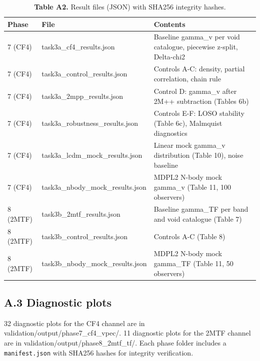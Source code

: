 \documentclass[11pt,a4paper]{article}
\begin{document}
\begin{table}[H]
\centering
\footnotesize
\caption{\textbf{Table A2.} Result files (JSON) with SHA256 integrity hashes.}
\begin{tabularx}{\linewidth}{l>{\RaggedRight\arraybackslash}X>{\RaggedRight\arraybackslash}X}
\toprule
\textbf{Phase} & \textbf{File} & \textbf{Contents} \tabularnewline
\midrule
7 (CF4) & task3a\_\allowbreak{}cf4\_\allowbreak{}results.json & Baseline gamma\_\allowbreak{}v per void catalogue, piecewise z-split, Delta-chi2 \tabularnewline
7 (CF4) & task3a\_\allowbreak{}control\_\allowbreak{}results.json & Controls A-C: density, partial correlation, chain rule \tabularnewline
7 (CF4) & task3a\_\allowbreak{}2mpp\_\allowbreak{}results.json & Control D: gamma\_\allowbreak{}v after 2M++ subtraction (Tables 6b) \tabularnewline
7 (CF4) & task3a\_\allowbreak{}robustness\_\allowbreak{}results.json & Controls E-F: LOSO stability (Table 6c), Malmquist diagnostics \tabularnewline
7 (CF4) & task3a\_\allowbreak{}lcdm\_\allowbreak{}mock\_\allowbreak{}results.json & Linear mock gamma\_\allowbreak{}v distribution (Table 10), noise baseline \tabularnewline
7 (CF4) & task3a\_\allowbreak{}nbody\_\allowbreak{}mock\_\allowbreak{}results.json & MDPL2 N-body mock gamma\_\allowbreak{}v (Table 11, 100 observers) \tabularnewline
8 (2MTF) & task3b\_\allowbreak{}2mtf\_\allowbreak{}results.json & Baseline gamma\_\allowbreak{}TF per band and void catalogue (Table 7) \tabularnewline
8 (2MTF) & task3b\_\allowbreak{}control\_\allowbreak{}results.json & Controls A-C (Table 8) \tabularnewline
8 (2MTF) & task3b\_\allowbreak{}nbody\_\allowbreak{}mock\_\allowbreak{}results.json & MDPL2 N-body mock gamma\_\allowbreak{}TF (Table 11, 50 observers) \tabularnewline
\bottomrule
\end{tabularx}
\end{table}

\subsection{A.3 Diagnostic plots}
32 diagnostic plots for the CF4 channel are in validation/\allowbreak{}output/\allowbreak{}phase7\_\allowbreak{}cf4\_\allowbreak{}vpec/\allowbreak{}. 11 diagnostic plots for the 2MTF channel are in validation/\allowbreak{}output/\allowbreak{}phase8\_\allowbreak{}2mtf\_\allowbreak{}tf/\allowbreak{}. Each phase folder includes a \texttt{manifest.json} with SHA256 hashes for integrity verification.
\end{document}
